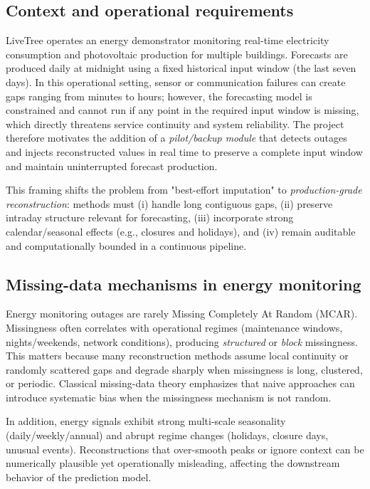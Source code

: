 \subsection{Context and operational requirements}
LiveTree operates an energy demonstrator monitoring real-time electricity consumption and photovoltaic production for multiple buildings. Forecasts are produced daily at midnight using a fixed historical input window (the last seven days). In this operational setting, sensor or communication failures can create gaps ranging from minutes to hours; however, the forecasting model is constrained and cannot run if any point in the required input window is missing, which directly threatens service continuity and system reliability. The project therefore motivates the addition of a \emph{pilot/backup module} that detects outages and injects reconstructed values in real time to preserve a complete input window and maintain uninterrupted forecast production.%
% 

This framing shifts the problem from "best-effort imputation" to \emph{production-grade reconstruction}: methods must (i) handle long contiguous gaps, (ii) preserve intraday structure relevant for forecasting, (iii) incorporate strong calendar/seasonal effects (e.g., closures and holidays), and (iv) remain auditable and computationally bounded in a continuous pipeline.%
% 

\subsection{Missing-data mechanisms in energy monitoring}
Energy monitoring outages are rarely Missing Completely At Random (MCAR). Missingness often correlates with operational regimes (maintenance windows, nights/weekends, network conditions), producing \emph{structured} or \emph{block} missingness. This matters because many reconstruction methods assume local continuity or randomly scattered gaps and degrade sharply when missingness is long, clustered, or periodic. Classical missing-data theory emphasizes that naive approaches can introduce systematic bias when the missingness mechanism is not random.%
% 

In addition, energy signals exhibit strong multi-scale seasonality (daily/weekly/annual) and abrupt regime changes (holidays, closure days, unusual events). Reconstructions that over-smooth peaks or ignore context can be numerically plausible yet operationally misleading, affecting the downstream behavior of the prediction model.%
% 

